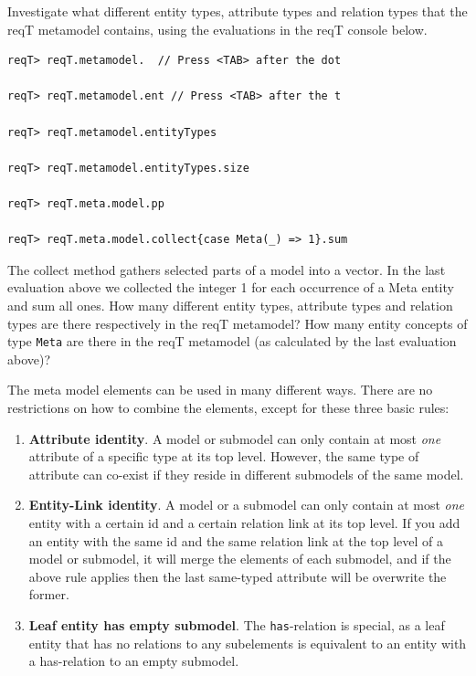 \documentclass[11pt]{article}
\begin{document}
Investigate what different entity types, attribute types and relation types that the reqT metamodel contains, using the evaluations in the reqT console below. 

\begin{framed}{\footnotesize\begin{verbatim}
reqT> reqT.metamodel.  // Press <TAB> after the dot

reqT> reqT.metamodel.ent // Press <TAB> after the t

reqT> reqT.metamodel.entityTypes

reqT> reqT.metamodel.entityTypes.size

reqT> reqT.meta.model.pp

reqT> reqT.meta.model.collect{case Meta(_) => 1}.sum
\end{verbatim}}
\noindent The collect method gathers selected parts of a model into a vector. In the last evaluation above we collected the integer 1 for each occurrence of a Meta entity and sum all ones.
\newline\newline 
\noindent
How many different entity types, attribute types and relation types are there respectively in the reqT metamodel? 
\newline
\newline \underline{\hspace{10cm}}
\newline\newline
How many entity concepts of type \verb+Meta+  are there in the reqT metamodel (as calculated by the last evaluation above)? 
\newline
\newline \underline{\hspace{10cm}}
\end{framed}

The meta model elements can be used in many different ways. There are no restrictions on how to combine the elements, except for these three basic rules:
\begin{enumerate}[nolistsep]
\item {\bf Attribute identity}. A model or submodel can only contain at most {\it one} attribute of a specific type at its top level. However, the same type of attribute can co-exist if they reside in different submodels of the same model. 
\item {\bf Entity-Link identity}. A model or a submodel can only contain at most {\it one} entity with a certain id and a certain relation link at its top level. If you add an entity with the same id and the same relation link at the top level of a model or submodel, it will merge the elements of each submodel, and if the above rule applies then the last same-typed attribute will be overwrite the former. 
\item {\bf Leaf entity has empty submodel}. The \verb+has+-relation is special, as a leaf entity that has no relations to any subelements is equivalent to an entity with a has-relation to an empty submodel. 
\end{enumerate}
\end{document}
